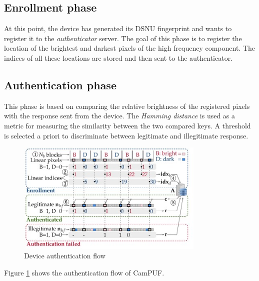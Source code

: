 \subsection{Enrollment phase}
At this point, the device has generated its DSNU fingerprint and wants to register it to the \textit{authenticator} server.
The goal of this phase is to register the location of the brightest and darkest pixels of the high frequency component. The indices of all these locations are stored
and then sent to the authenticator.

\subsection{Authentication phase}
This phase is based on comparing the relative brightness of the registered pixels with the response sent from the device. The \textit{Hamming distance} is used as a
metric for measuring the similarity between the two compared keys. A threshold is selected a priori to discriminate between legitimate and illegitimate response.
\begin{figure}[h!]    
    \centering
    \includegraphics[width=0.8\textwidth]{images/device_auth_flow.jpg}
    \caption{Device authentication flow}
    \label{fig:authflow}
\end{figure}
Figure \ref{fig:authflow} shows the authentication flow of CamPUF.
